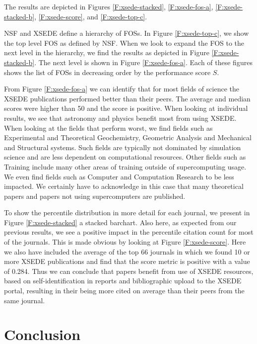 \documentclass{sig-alternate}
\begin{document}
The results are depicted in Figures \ref{F:xsede-stacked}, \ref{F:xsede-fos-a}, \ref{F:xsede-stacked-b}, \ref{F:xsede-score}, and \ref{F:xsede-top-c}. 

NSF and XSEDE define a hierarchy of FOSs. In Figure \ref{F:xsede-top-c}, we show the top level FOS as defined by NSF. When we look to expand the FOS to the next level in the hierarchy, we find the results as depicted in Figure \ref{F:xsede-stacked-b}. The next level is shown in Figure \ref{F:xsede-fos-a}. Each of these figures shows the list of FOSs in decreasing order by the performance score $S$. 

From Figure \ref{F:xsede-fos-a} we can identify that for most fields of science the XSEDE publications performed better than their peers. The average and median scores were higher than 50 and the score is positive. When looking at individual results, we see that astronomy and physics benefit most from using XSEDE. When looking at the fields that perform worst, we find fields such as Experimental and Theoretical Geochemistry, Geometric Analysis and Mechanical and Structural systems. Such fields are typically not dominated by simulation science and are less dependent on computational resources. Other fields such as Training include many other areas of training outside of supercomputing usage. We even find fields such as Computer and Computation Research to be less impacted. We certainly have to acknowledge in this case that many theoretical papers and papers not using supercomputers are published. 

To show the percentile distribution in more detail for each journal, we present in Figure \ref{F:xsede-stacked} a stacked barchart. Also here, as expected from our previous results, we see a positive impact in the percentile citation count for most of the journals. This is made obvious by looking at Figure \ref{F:xsede-score}. Here we also have included the average of the top 66 journals in which we found 10 or more XSEDE publications and find that the score metric is positive with a value of 0.284. Thus we can conclude that papers benefit from use of XSEDE resources, based on self-identification in reports and bibliographic upload to the XSEDE portal, resulting in their being more cited on average than their peers from the same journal.


\section{Conclusion} \label{S:conclusion}
\end{document}
